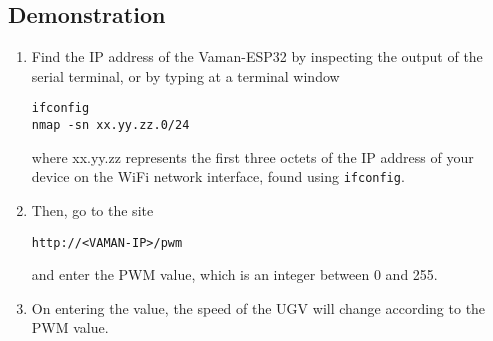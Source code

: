 \subsection{Demonstration}
\begin{enumerate}
    \item Find the IP address of the Vaman-ESP32 by inspecting the output of the
    serial terminal, or by typing at a terminal window
    \begin{lstlisting}
ifconfig
nmap -sn xx.yy.zz.0/24
    \end{lstlisting}
    where xx.yy.zz represents the first three octets of the IP address of your
    device on the WiFi network interface, found using \texttt{ifconfig}.
    \item Then, go to the site 
    \begin{lstlisting}
http://<VAMAN-IP>/pwm 
    \end{lstlisting}
    and enter the PWM value, which is an integer between 0 and 255.
    \item On entering the value, the speed of the UGV will change according to
    the PWM value.
\end{enumerate}
